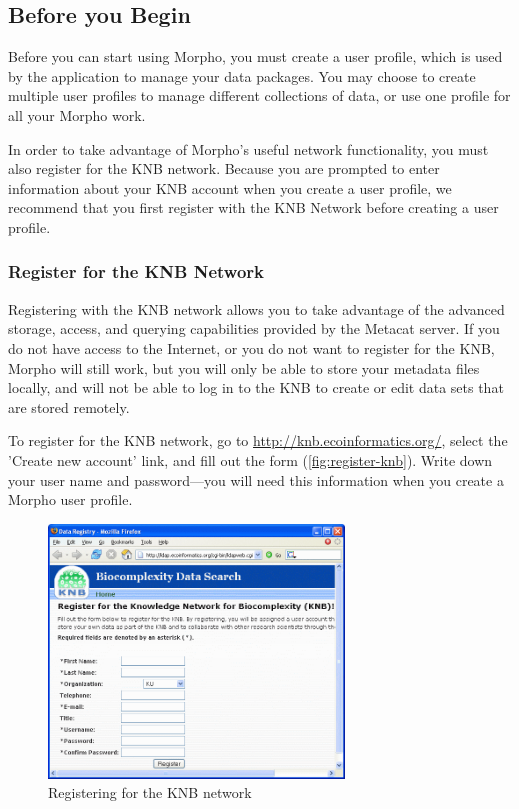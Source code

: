 \subsection{Before you Begin} \label{sec:before-you-begin}

Before you can start using Morpho, you must create a user profile, which
is used by the application to manage your data packages. You may choose
to create multiple user profiles to manage different collections of
data, or use one profile for all your Morpho work. 

In order to take advantage of Morpho's useful network functionality, you
must also register for the KNB network.  Because you are prompted to
enter information about your KNB account when you create a user profile,
we recommend that you first register with the KNB Network before
creating a user profile.

\subsubsection{Register for the KNB Network} \label{sec:register}

Registering with the KNB network allows you to take advantage of the
advanced storage, access, and querying capabilities provided by the
Metacat server. If you do not have access to the Internet, or you do not
want to register for the KNB, Morpho will still work, but you will only
be able to store your metadata files locally, and will not be able to
log in to the KNB to create or edit data sets that are stored remotely.

To register for the KNB network, go to
\url{http://knb.ecoinformatics.org/}, select the 'Create new account'
link, and fill out the form (\autoref{fig:register-knb}). Write down
your user name and password—you will need this information when you
create a Morpho user profile.

\begin{figure}
  \centering
    \includegraphics[width=0.7\textwidth]{images/register-knb.png}
  \caption{Registering for the KNB network}
  \label{fig:register-knb}
\end{figure}

